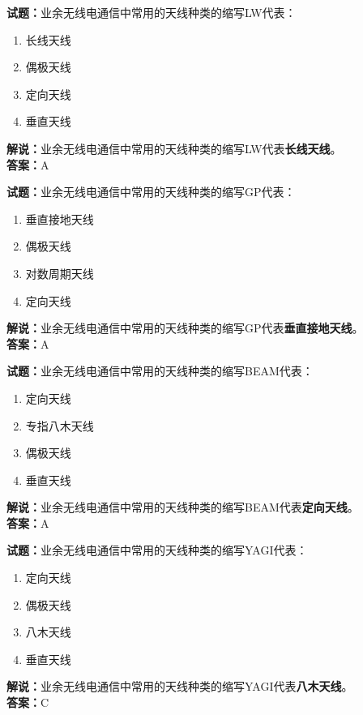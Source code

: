 \documentclass{ctexbook}
\begin{document}
\bigskip


\noindent\textbf{试题：}业余无线电通信中常用的天线种类的缩写LW代表：
\begin{enumerate}[leftmargin=3em]
\item 长线天线
\item 偶极天线
\item 定向天线
\item 垂直天线
\end{enumerate}
\noindent\textbf{解说：}业余无线电通信中常用的天线种类的缩写LW代表\textbf{长线天线}。\\\noindent\textbf{答案：}A



\bigskip


\noindent\textbf{试题：}业余无线电通信中常用的天线种类的缩写GP代表：
\begin{enumerate}[leftmargin=3em]
\item 垂直接地天线
\item 偶极天线
\item 对数周期天线
\item 定向天线
\end{enumerate}
\noindent\textbf{解说：}业余无线电通信中常用的天线种类的缩写GP代表\textbf{垂直接地天线}。\\\noindent\textbf{答案：}A



\bigskip


\noindent\textbf{试题：}业余无线电通信中常用的天线种类的缩写BEAM代表：
\begin{enumerate}[leftmargin=3em]
\item 定向天线
\item 专指八木天线
\item 偶极天线
\item 垂直天线
\end{enumerate}
\noindent\textbf{解说：}业余无线电通信中常用的天线种类的缩写BEAM代表\textbf{定向天线}。\\\noindent\textbf{答案：}A


\bigskip


\noindent\textbf{试题：}业余无线电通信中常用的天线种类的缩写YAGI代表：
\begin{enumerate}[leftmargin=3em]
\item 定向天线
\item 偶极天线
\item 八木天线
\item 垂直天线
\end{enumerate}
\noindent\textbf{解说：}业余无线电通信中常用的天线种类的缩写YAGI代表\textbf{八木天线}。\\\noindent\textbf{答案：}C
\end{document}
